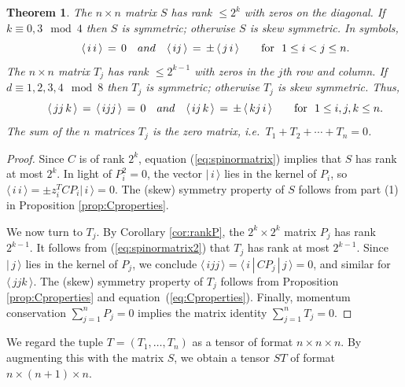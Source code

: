 \documentclass[english]{ourlematema}
\newtheorem{theorem}{Theorem}
\numberwithin{theorem}{section}
\theoremstyle{definition}
\begin{document}
\begin{theorem}\label{thm:basicspinprops}
    The $n \times n$ matrix $S$ has rank $\le 2^{k}$ with zeros on the diagonal.
     If $k \equiv 0,3 \!\!\mod{4}$ then $S$ is symmetric;
       otherwise $S$ is skew symmetric. In symbols, 
    $$ \qquad
    \langle \, i\,i\,\rangle\, =\, 0 \quad {\rm and} \quad
        \langle \,ij\, \rangle \,=\, \pm\, \langle \,j\,i \, \rangle
        \qquad \hbox{for}\,\, \,\, 1 \leq i < j \leq n.
$$
The $n \times n$ matrix
    $T_j$ has rank $\le 2^{k  - 1}$ with zeros in the $j$th row
    and column.
        If $d \equiv 1,2,3,4 \!\! \mod 8$ then $T_j$ is symmetric;
        otherwise $T_j$ is skew symmetric. Thus,
            $$ \qquad
    \langle\, jj\,k\, \rangle \,=\, \langle\, ijj\, \rangle \,=\, 0 \quad {\rm and} \quad
    \langle \, ij\,k \, \rangle \,=\, \pm \,\langle \, kj\,i \, \rangle
 \qquad \hbox{for} \,\,\,\, 1 \leq i,j,k \leq n.    
    $$
    The sum of the $n$ matrices $T_j$ is the zero matrix, i.e.~$T_1 + T_2 + \cdots + T_n = 0$.
    \end{theorem}


\begin{proof}
    Since $C$ is of rank $2^{k}$, equation (\ref{eq:spinormatrix})
    implies that $S$ has rank at most $2^k$.
    In light of $P_i^2 = 0$, the vector $|\, i \, \rangle$ lies in the kernel of $P_i$,
     so $\langle \, i\, i \, \rangle = 
     \pm z_i^TCP_i | \, i \,\rangle = 0$.
    The (skew) symmetry property of $S$ follows from
    part (1) in Proposition \ref{prop:Cproperties}.

We now turn to $T_j$.
    By Corollary \ref{cor:rankP},
    the $2^k \times 2^k$ matrix
     $P_j$ has rank $2^{k - 1}$.
      It follows from (\ref{eq:spinormatrix2}) that $T_j$ has rank at most $2^{k - 1}$.
    Since $|\, j \, \rangle$ lies in the kernel of $P_j$, we conclude
    $\langle \, ijj \, \rangle = \langle \, i \, |\,C P_j\,| \, j\, \rangle = 0$,
    and similar for $\langle \, jjk \, \rangle$. The (skew) symmetry property of $T_j$ follows from Proposition \ref{prop:Cproperties} and equation~(\ref{eq:Cproperties}).
Finally,   momentum conservation $\sum_{j=1}^n P_j = 0$
implies the matrix identity $\sum_{j=1}^n T_j = 0$.
\end{proof}

We regard the tuple $T = (T_1,\ldots,T_n)$
as a tensor of format $n \times n \times n$.
By augmenting this with the matrix $S$,
we obtain a tensor $ST$ of format $n \times (n + 1) \times n$.
\end{document}
